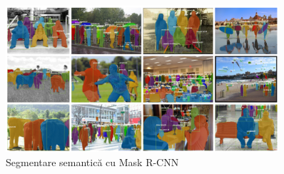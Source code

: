 \begin{figure}[h!]
    	\centering
	\captionsetup{justification=centering, margin=2cm}
	\includegraphics[width=0.9\textwidth]{figures/image_segmentation_results_mrcnn.png}
	\caption{Segmentare semantică cu Mask R-CNN \cite{DBLP:journals/corr/HeGDG17}}
	\label{fig:segmentare_semantica cu Mask R-CNN}
\end{figure}